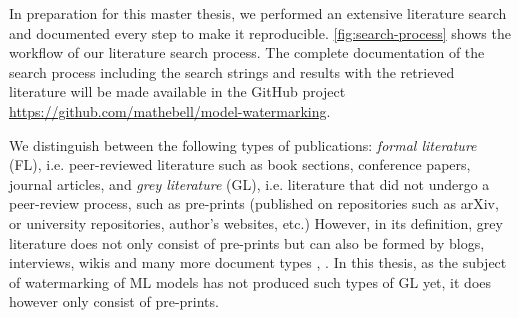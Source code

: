 In preparation for this master thesis, we performed an extensive literature search and documented every step to make it reproducible. \cref{fig:search-process} shows the workflow of our literature search process. The complete documentation of the search process including the search strings and results with the retrieved literature will be made available in the GitHub project \url{https://github.com/mathebell/model-watermarking}.

We distinguish between the following types of publications: \textit{formal literature} (FL), i.e. peer-reviewed literature such as book sections, conference papers, journal articles, and \textit{grey literature} (GL), i.e. literature that did not undergo a peer-review process, such as pre-prints (published on repositories such as arXiv, or university repositories, author's websites, etc.) However, in its definition, grey literature does not only consist of pre-prints but can also be formed by blogs, interviews, wikis and many more document types \cite{mahood_searching_2014}, \cite{noauthor_greynet_nodate}. In this thesis, as the subject of watermarking of ML models has not produced such types of GL yet, it does however only consist of pre-prints.

